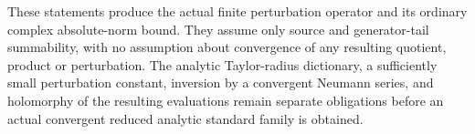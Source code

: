 \begin{remark}
These statements produce the actual finite perturbation operator and its ordinary complex absolute-norm bound. They assume only source and generator-tail summability, with no assumption about convergence of any resulting quotient, product or perturbation. The analytic Taylor-radius dictionary, a sufficiently small perturbation constant, inversion by a convergent Neumann series, and holomorphy of the resulting evaluations remain separate obligations before an actual convergent reduced analytic standard family is obtained.
\end{remark}
